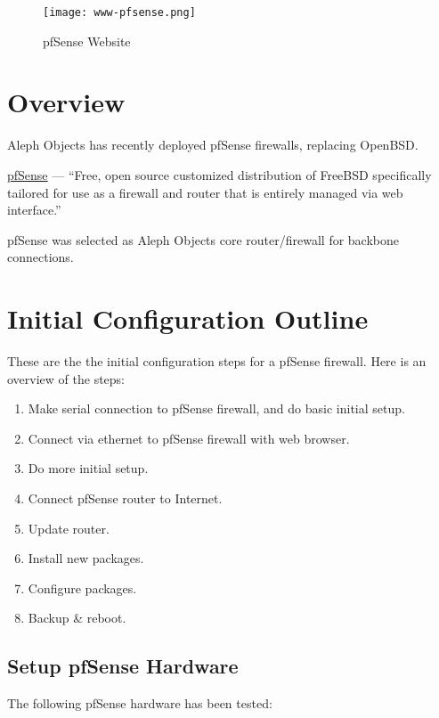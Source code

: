 %
%
%
%
%
\begin{figure}[h!]
\begin{center}
\texttt{[image: www-pfsense.png]}
 \caption{pfSense Website}
 \label{fig:www-pfsense}
\end{center}
\end{figure}

\section{Overview}
Aleph Objects has recently deployed pfSense firewalls, replacing OpenBSD.

\href{https://www.pfsense.org/}{pfSense} --- ``Free, open source customized
distribution of FreeBSD specifically tailored for use as a firewall and router
that is entirely managed via web interface.''

pfSense was selected as Aleph Objects core router/firewall for backbone
connections.

\section{Initial Configuration Outline}

These are the the initial configuration steps for a pfSense firewall. Here is an overview of the steps:

\begin{enumerate}
 \item Make serial connection to pfSense firewall, and do basic initial setup.
 \item Connect via ethernet to pfSense firewall with web browser.
 \item Do more initial setup.
 \item Connect pfSense router to Internet.
 \item Update router.
 \item Install new packages.
 \item Configure packages.
 \item Backup \& reboot.
\end{enumerate}


\subsection{Setup pfSense Hardware}
The following pfSense hardware has been tested:

